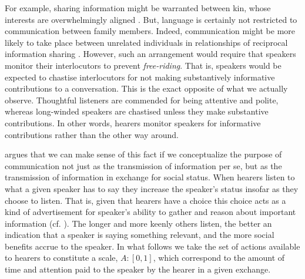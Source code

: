 \documentclass[linguex]{sp}
\theoremstyle{definition} \newtheorem{definition}{Definition}
\begin{document}
For example,  sharing information might be warranted between kin, whose interests are overwhelmingly  aligned \citep{hamilton1963,hamilton1964}. But, language is certainly not restricted to communication between family members. Indeed, communication might be more likely to take place between unrelated individuals in relationships of reciprocal information sharing \citep{trivers1971}. However, such an arrangement would require that speakers monitor their interlocutors to prevent \emph{free-riding}. That is, speakers would be expected to chastise interlocutors for not making substantively informative contributions to a conversation. This is the exact opposite of what we actually observe. Thoughtful listeners are commended for being attentive and polite, whereas long-winded speakers are chastised unless they make substantive contributions. In other words, hearers monitor speakers for informative contributions rather than the other way around.

\cite{dessalles2007} argues that we can make sense of this fact if we conceptualize the purpose of communication not just as the transmission of information per se, but as the transmission of information in exchange for social status.  When hearers listen to what a given speaker has to say they increase the speaker's status insofar as they choose to listen. That is, given that hearers have a choice this choice acts as a kind of advertisement for speaker's ability to gather and reason about important information (cf. \citealt{gintis2001,dessalles2014}).  The longer and more keenly others listen, the better an indication that a speaker is saying something relevant, and the more social benefits accrue to the speaker. In what follows we take the set of actions available to hearers to constitute a scale, $A : [0,1]$, which correspond to the amount of time and attention paid to the speaker by the hearer in a given exchange.
\end{document}
